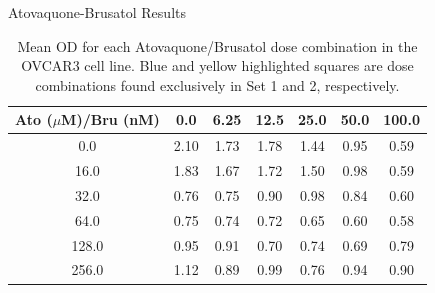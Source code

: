 \documentclass{beamer}
\begin{document}
\begin{frame}{Atovaquone-Brusatol Results}
    \begin{table}
        \centering
        \begin{tabular}{c|c|c|c|c|c|c}
            Ato ($\mu$M)/Bru (nM)   & 0.0  & 6.25 & 12.5 & 25.0 & 50.0 & 100.0  \\\hline
            0.0                     & \cellcolor{ white!00} 2.10 & \cellcolor{  blue!35} 1.73 & \cellcolor{  blue!35} 1.78 & \cellcolor{  blue!35} 1.44 & \cellcolor{  blue!35} 0.95 & \cellcolor{  blue!35} 0.59   \\
            16.0                    & \cellcolor{  blue!35} 1.83 & \cellcolor{yellow!75} 1.67 & \cellcolor{  blue!35} 1.72 & \cellcolor{yellow!75} 1.50 & \cellcolor{yellow!75} 0.98 & \cellcolor{yellow!75} 0.59   \\
            32.0                    & \cellcolor{  blue!35} 0.76 & \cellcolor{  blue!35} 0.75 & \cellcolor{yellow!75} 0.90 & \cellcolor{  blue!35} 0.98 & \cellcolor{yellow!75} 0.84 & \cellcolor{yellow!75} 0.60   \\
            64.0                    & \cellcolor{  blue!35} 0.75 & \cellcolor{yellow!75} 0.74 & \cellcolor{  blue!35} 0.72 & \cellcolor{yellow!75} 0.65 & \cellcolor{  blue!35} 0.60 & \cellcolor{yellow!75} 0.58   \\
            128.0                   & \cellcolor{  blue!35} 0.95 & \cellcolor{yellow!75} 0.91 & \cellcolor{yellow!75} 0.70 & \cellcolor{  blue!35} 0.74 & \cellcolor{yellow!75} 0.69 & \cellcolor{  blue!35} 0.79   \\
            256.0                   & \cellcolor{  blue!35} 1.12 & \cellcolor{yellow!75} 0.89 & \cellcolor{yellow!75} 0.99 & \cellcolor{yellow!75} 0.76 & \cellcolor{  blue!35} 0.94 & \cellcolor{yellow!75} 0.90   \\
        \end{tabular}
        \label{table:ato-bru-mean}
        \caption{
            Mean OD for each Atovaquone/Brusatol dose combination in the OVCAR3 cell line. 
            Blue and yellow highlighted squares are dose combinations found exclusively in Set 1 and 2, respectively.
        }
    \end{table}
\end{frame}
\end{document}
